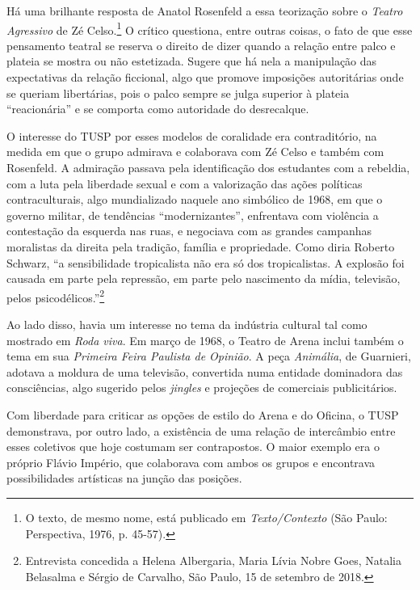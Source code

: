 Há uma brilhante resposta de Anatol Rosenfeld a essa teorização sobre o
\textit{Teatro Agressivo} de Zé Celso.\footnote{O texto, de mesmo nome,
  está publicado em \textit{Texto/Contexto} (São Paulo: Perspectiva, 1976,
  p. 45-57).} O crítico questiona, entre outras coisas, o fato de que
esse pensamento teatral se reserva o direito de dizer quando a relação
entre palco e plateia se mostra ou não estetizada. Sugere que há nela a
manipulação das expectativas da relação ficcional, algo que promove
imposições autoritárias onde se queriam libertárias, pois o palco sempre
se julga superior à plateia “reacionária” e se comporta como autoridade
do desrecalque.

O interesse do TUSP por esses modelos de coralidade era contraditório,
na medida em que o grupo admirava e colaborava com Zé Celso e também com
Rosenfeld. A admiração passava pela identificação dos estudantes com a
rebeldia, com a luta pela liberdade sexual e com a valorização das ações
políticas contraculturais, algo mundializado naquele ano simbólico de
1968, em que o governo militar, de tendências “modernizantes”,
enfrentava com violência a contestação da esquerda nas ruas, e negociava
com as grandes campanhas moralistas da direita pela tradição, família e
propriedade. Como diria Roberto Schwarz, “a sensibilidade tropicalista
não era só dos tropicalistas. A explosão foi causada em parte pela
repressão, em parte pelo nascimento da mídia, televisão, pelos
psicodélicos.”\footnote{Entrevista concedida a Helena Albergaria, Maria
  Lívia Nobre Goes, Natalia Belasalma e Sérgio de Carvalho, São Paulo,
  15 de setembro de 2018.}

Ao lado disso, havia um interesse no tema da indústria cultural tal como
mostrado em \textit{Roda viva}. Em março de 1968, o Teatro de Arena inclui
também o tema em sua \textit{Primeira Feira Paulista de Opinião}. A peça
\textit{Animália}, de Guarnieri, adotava a moldura de uma televisão,
convertida numa entidade dominadora das consciências, algo sugerido
pelos \textit{jingles} e projeções de comerciais publicitários.

Com liberdade para criticar as opções de estilo do Arena e do Oficina, o
TUSP demonstrava, por outro lado, a existência de uma relação de
intercâmbio entre esses coletivos que hoje costumam ser contrapostos. O
maior exemplo era o próprio Flávio Império, que colaborava com ambos os
grupos e encontrava possibilidades artísticas na junção das posições.

